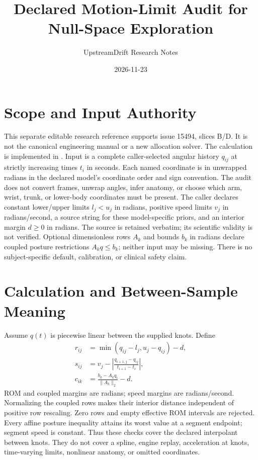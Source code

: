 \documentclass{article}
\title{Declared Motion-Limit Audit for Null-Space Exploration}
\author{UpstreamDrift Research Notes}
\date{2026-11-23}
\begin{document}
\maketitle
\section{Scope and Input Authority}
This separate editable research reference supports issue 15494, slices B/D.
It is not the canonical engineering manual or a new allocation solver.
The calculation is implemented in
.
Input is a complete caller-selected angular history $q_{ij}$ at strictly
increasing times $t_i$ in seconds. Each named coordinate is in unwrapped
radians in the declared model's coordinate order and sign convention.
The audit does not convert frames, unwrap angles, infer anatomy, or choose
which arm, wrist, trunk, or lower-body coordinates must be present.
The caller declares constant lower/upper limits $l_j<u_j$ in radians,
positive speed limits $v_j$ in radians/second, a source string for these
model-specific priors, and an interior margin $d\geq0$ in radians.
The source is retained verbatim; its scientific validity is not verified.
Optional dimensionless rows $A_k$ and bounds $b_k$ in radians declare
coupled posture restrictions $A_kq\leq b_k$; neither input may be missing.
There is no subject-specific default, calibration, or clinical safety claim.
\section{Calculation and Between-Sample Meaning}
Assume $q(t)$ is piecewise linear between the supplied knots. Define
\begin{align*}
 r_{ij}&=\min(q_{ij}-l_j,u_j-q_{ij})-d,\\
 s_{ij}&=v_j-\left|\frac{q_{i+1,j}-q_{ij}}{t_{i+1}-t_i}\right|,\\
 c_{ik}&=\frac{b_k-A_kq_i}{\lVert A_k\rVert_2}-d.
\end{align*}
ROM and coupled margins are radians; speed margins are radians/second.
Normalizing the coupled rows makes their interior distance independent of
positive row rescaling. Zero rows and empty effective ROM intervals are rejected.
Every affine posture inequality attains its worst value at a segment endpoint;
segment speed is constant. Thus these checks cover the declared interpolant
between knots. They do not cover a spline, engine replay, acceleration at knots,
time-varying limits, nonlinear anatomy, or omitted coordinates.
\end{document}
